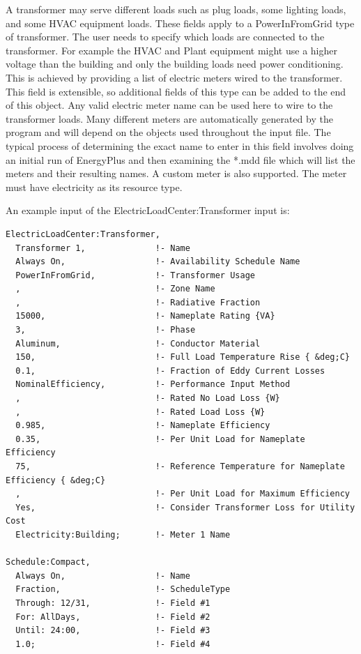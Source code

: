 A transformer may serve different loads such as plug loads, some lighting loads, and some HVAC equipment loads. These fields apply to a PowerInFromGrid type of transformer. The user needs to specify which loads are connected to the transformer. For example the HVAC and Plant equipment might use a higher voltage than the building and only the building loads need power conditioning. This is achieved by providing a list of electric meters wired to the transformer.  This field is extensible, so additional fields of this type can be added to the end of this object.  Any valid electric meter name can be used here to wire to the transformer loads. Many different meters are automatically generated by the program and will depend on the objects used throughout the input file. The typical process of determining the exact name to enter in this field involves doing an initial run of EnergyPlus and then examining the *.mdd file which will list the meters and their resulting names. A custom meter is also supported. The meter must have electricity as its resource type.

An example input of the ElectricLoadCenter:Transformer input is:

\begin{lstlisting}
ElectricLoadCenter:Transformer,
  Transformer 1,              !- Name
  Always On,                  !- Availability Schedule Name
  PowerInFromGrid,            !- Transformer Usage
  ,                           !- Zone Name
  ,                           !- Radiative Fraction
  15000,                      !- Nameplate Rating {VA}
  3,                          !- Phase
  Aluminum,                   !- Conductor Material
  150,                        !- Full Load Temperature Rise { &deg;C}
  0.1,                        !- Fraction of Eddy Current Losses
  NominalEfficiency,          !- Performance Input Method
  ,                           !- Rated No Load Loss {W}
  ,                           !- Rated Load Loss {W}
  0.985,                      !- Nameplate Efficiency
  0.35,                       !- Per Unit Load for Nameplate Efficiency
  75,                         !- Reference Temperature for Nameplate Efficiency { &deg;C}
  ,                           !- Per Unit Load for Maximum Efficiency
  Yes,                        !- Consider Transformer Loss for Utility Cost
  Electricity:Building;       !- Meter 1 Name

Schedule:Compact,
  Always On,                  !- Name
  Fraction,                   !- ScheduleType
  Through: 12/31,             !- Field #1
  For: AllDays,               !- Field #2
  Until: 24:00,               !- Field #3
  1.0;                        !- Field #4
\end{lstlisting}

